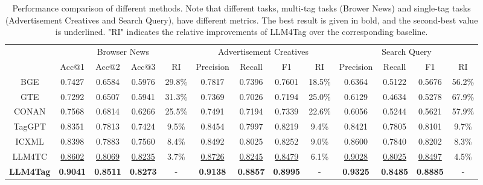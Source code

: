 \begin{table*}
\caption{Performance comparison of different methods. Note that different tasks, multi-tag tasks (Brower News) and single-tag tasks (Advertisement Creatives and Search Query), have different metrics. The best result is given in bold, and the second-best value is underlined. "RI" indicates the relative improvements of LLM4Tag over the corresponding baseline.}
\label{table:all}
 \renewcommand\arraystretch{1.1}
\begin{threeparttable}[htbp]{
\begin{tabular}{c|cccc|cccc|cccc}
\midrule
 {\multirow{2}{*}{{Model}}} & \multicolumn{4}{c|}{{Browser News}} & \multicolumn{4}{c|}{{Advertisement Creatives}} & \multicolumn{4}{c}{{Search Query}} \\ 
\cmidrule(lr){2-5}\cmidrule(lr){6-9}\cmidrule(lr){10-13}
  & Acc@1 & Acc@2 & Acc@3 & RI & Precision & Recall & F1 & RI & Precision & Recall & F1 & RI \\ 
\midrule
  BGE & 0.7427 & 0.6584 & 0.5976 & 29.8\% & 0.7817 & 0.7396   & 0.7601 & 18.5\% & 0.6364 & 0.5122  & 0.5676&  56.2\% \\
  GTE & 0.7292 & 0.6507 & 0.5941 & 31.3\% & 0.7369 & 0.7026  & 0.7194& 25.0\%  & 0.6129 & 0.4634 & 0.5278 & 67.9\% \\
 CONAN  & 0.7568 & 0.6814 & 0.6266 & 25.5\%  & 0.7491  & 0.7194 & 0.7339& 22.6\% & 0.6056 & 0.5244 & 0.5621& 57.9\% \\
\midrule
 TagGPT & 0.8351 & 0.7813 & 0.7424 &   9.5\%  & 0.8454 & 0.7997  & 0.8219& 9.4\% & 0.8421 & 0.7805  & 0.8101 & 9.7\% \\
 ICXML & 0.8398 & 0.7883 & 0.7560 & 8.4\%  & 0.8492  & 0.8025  & 0.8252 & 9.0\% & 0.8600 & 0.7840 & 0.8202& 8.3\% \\
 LLM4TC & \underline{0.8602} & \underline{0.8069} & \underline{0.8235} & 3.7\% & \underline{0.8726} & \underline{0.8245}  & \underline{0.8479} & 6.1\% & \underline{0.9028} & \underline{0.8025} & \underline{0.8497} & 4.5\% \\
\midrule
 \textbf{LLM4Tag} & \textbf{0.9041}  & \textbf{0.8511} & \textbf{0.8273} & - & \textbf{0.9138} & \textbf{0.8857} & \textbf{0.8995} &-  & \textbf{0.9325} & \textbf{0.8485} & \textbf{0.8885} & -\\  
  \midrule          
\end{tabular}
}
\end{threeparttable}
\end{table*}

